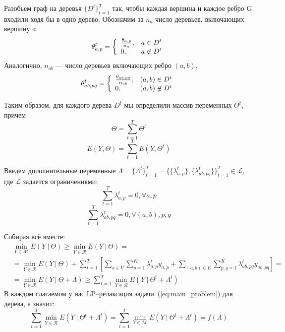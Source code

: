 \documentclass{article}
\begin{document}
Разобьем граф на деревья $\{D^t\}_{t=1}^T$ так, чтобы каждая вершина и каждое ребро G входили ходя бы в одно дерево. Обозначим за $n_a$ число деревьев, включающих вершину $a$.
\begin{equation*}
\theta_{a,p}^t = \left\{ 
\begin{array}{l l}
\frac{\theta_{a,p}}{n_a}, & a \in D^t\\
0, & a \not \in D^t
\end{array} \right.
\end{equation*}
Аналогично, $n_{ab}$ --- число деревьев включающих ребро $(a, b)$,
\begin{equation*}
\theta_{ab,pq}^t = \left\{ 
\begin{array}{l l}
\frac{\theta_{ab,pq}}{n_{ab}}, & (a,b) \in D^t\\
0, & (a,b) \not \in D^t
\end{array} \right.
\end{equation*}

Таким образом, для каждого дерева $D^t$ мы определили массив переменных $\Theta^t$, причем
\begin{equation*}
\Theta = \sum_{t = 1}^{T} \Theta^t
\end{equation*}
\begin{equation*}
E(Y, \Theta) = \sum_{t = 1}^{T} E(Y, \Theta^t)
\end{equation*}

Введем дополнительные переменные $\Lambda = \{\Lambda^t\}_{t=1}^T = \{\{\lambda_{a,p}^t\},\{\lambda_{ab,pq}^t\}\}_{t=1}^T \in \mathcal{L}$, где $\mathcal{L}$ задается ограничениями:
\begin{equation*}
\sum_{t = 1}^{T} \lambda_{a,p}^t = 0, \forall a, p
\end{equation*}
\begin{equation*}
\sum_{t = 1}^{T} \lambda_{ab,pq}^t = 0, \forall (a, b), p,q
\end{equation*}

Собирая всё вместе:
\begin{align*}
&\min_{Y \in \mathcal{M}} E(Y~|~\Theta) \geq \min_{Y \in \mathcal{R}} E(Y~|~\Theta) = \\
&= \min_{Y \in \mathcal{R}} E(Y~|~\Theta) + \sum_{t = 1}^{T} \left [ \sum_{a \in V} \sum_{p = 1}^{K} \lambda_{a,p}^t y_{a,p} + \sum_{(a,b) \in E} \sum_{p,q = 1}^{K} \lambda_{ab,pq}^t y_{ab,pq} \right] = \\
&=\min_{Y \in \mathcal{R}} E(Y~|~\Theta + \Lambda) \geq \sum_{t = 1}^{T} \min_{Y \in \mathcal{R}} E(Y~|~\Theta^t + \Lambda^t)
\end{align*}
В каждом слагаемом у нас LP--релаксация задачи~(\ref{eq:main_problem}) для дерева, а значит:
\begin{equation}
\sum_{t = 1}^{T} \min_{Y \in \mathcal{R}} E(Y~|~\Theta^t + \Lambda^t) = \sum_{t = 1}^{T} \min_{Y \in \mathcal{M}} E(Y~|~\Theta^t + \Lambda^t) = f(\Lambda)
\end{equation}
\end{document}

